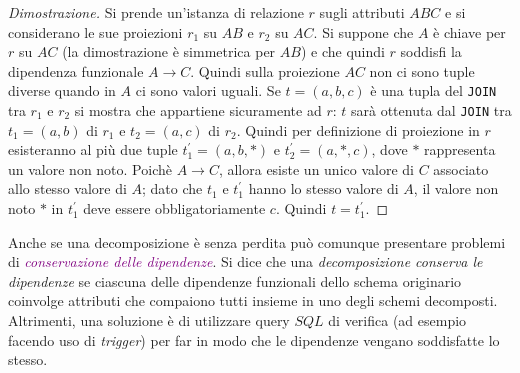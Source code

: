 \begin{proof}[Dimostrazione]
    Si prende un'istanza di relazione $r$ sugli attributi $ABC$ e si considerano
    le sue proiezioni $r_1$ su $AB$ e $r_2$ su $AC$.
    Si suppone che $A$ è chiave per $r$ su $AC$ (la dimostrazione è simmetrica per $AB$) e
    che quindi $r$ soddisfi la dipendenza funzionale $A \rightarrow C$. Quindi sulla
    proiezione $AC$ non ci sono tuple diverse quando in $A$ ci sono valori uguali.
    Se $t = (a,b,c)$ è una tupla del \verb|JOIN| tra $r_1$ e $r_2$ si mostra che appartiene
    sicuramente ad $r$: $t$ sarà ottenuta dal \verb|JOIN| tra $t_1 = (a,b)$ di $r_1$
    e $t_2 = (a,c)$ di $r_2$. Quindi per definizione di proiezione in $r$ esisteranno al più due tuple
    $t_{1}^{'} = (a,b,*)$ e $t_{2}^{'} = (a,*,c)$, dove $*$ rappresenta un valore non noto.
    Poichè $A \rightarrow C$, allora esiste un unico valore di $C$ associato allo stesso valore di $A$;
    dato che $t_1$ e $t_{1}^{'}$ hanno lo stesso valore di $A$, il valore non noto $*$ in $t_{1}^{'}$
    deve essere obbligatoriamente $c$. Quindi $t = t_{1}^{'}$.
\end{proof}

Anche se una decomposizione è senza perdita può comunque presentare problemi di \emph{\textcolor{purple}{conservazione delle dipendenze}}.
Si dice che una \emph{decomposizione conserva le dipendenze} se ciascuna delle dipendenze funzionali dello schema originario
coinvolge attributi che compaiono tutti insieme in uno degli schemi decomposti.
Altrimenti, una soluzione è di utilizzare query $SQL$ di verifica (ad esempio facendo uso di \emph{trigger}) per
far in modo che le dipendenze vengano soddisfatte lo stesso.